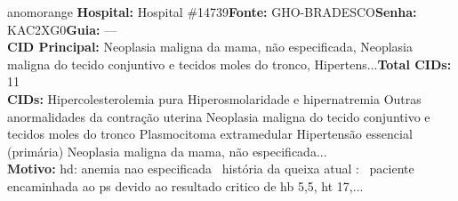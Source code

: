 \documentclass[a4paper,10pt]{article}
\begin{document}
\begin{anomalycard}[Interna\c{c}\~{a}o \#119528 | Pac. \#71316 | ALTO (z=3.66) | LOS: 6d | 03/03/2026\,$\to$\,09/03/2026]{anomorange}
\textbf{Hospital:} Hospital \#14739\quad \textbf{Fonte:} GHO-BRADESCO\quad \textbf{Senha:} KAC2XG0\quad \textbf{Guia:} ---\\

\textbf{CID Principal:} {\small Neoplasia maligna da mama, não especificada, Neoplasia maligna do tecido conjuntivo e tecidos moles do tronco, Hipertens...}\quad\textbf{Total CIDs:} 11\\

\textbf{CIDs:} {\scriptsize Hipercolesterolemia pura \textbar{} Hiperosmolaridade e hipernatremia \textbar{} Outras anormalidades da contração uterina \textbar{} Neoplasia maligna do tecido conjuntivo e tecidos moles do tronco \textbar{} Plasmocitoma extramedular \textbar{} Hipertensão essencial (primária) \textbar{} Neoplasia maligna da mama, não especificada...}\\

\textbf{Motivo:} {\scriptsize hd: anemia nao especificada  história da queixa atual :  paciente encaminhada ao ps devido ao resultado critico de hb 5,5, ht 17,...}\\




\end{anomalycard}
\end{document}
